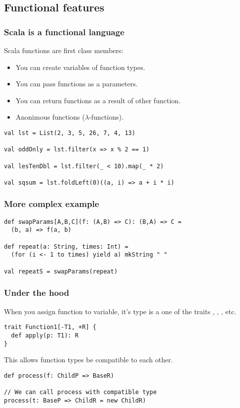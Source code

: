 \documentclass{beamer}
\begin{document}
\subsection{Functional features}

\begin{frame}[fragile]
\frametitle{Scala is a functional language}
  Scala functions are first class members:
  \begin{itemize}
    \item You can create variables of function types.
    \item You can pass functions as a parameters.
    \item You can return functions as a result of other function.
    \item Anonimous functions ($\lambda$-functions).
  \end{itemize}
  \begin{example}
\begin{lstlisting}
val lst = List(2, 3, 5, 26, 7, 4, 13)

val oddOnly = lst.filter(x => x % 2 == 1)

val lesTenDbl = lst.filter(_ < 10).map(_ * 2)

val sqsum = lst.foldLeft(0)((a, i) => a + i * i)
\end{lstlisting}
  \end{example}
\end{frame}

\begin{frame}[fragile]
\frametitle{More complex example}

    \begin{lstlisting}
def swapParams[A,B,C](f: (A,B) => C): (B,A) => C = 
  (b, a) => f(a, b)

def repeat(a: String, times: Int) = 
  (for (i <- 1 to times) yield a) mkString " "

val repeatS = swapParams(repeat)
    \end{lstlisting}

\end{frame}

\begin{frame}[fragile]
\frametitle{Under the hood}

When you assign function to variable, it's type is a one of the traits , , , etc.
\begin{lstlisting}
trait Function1[-T1, +R] {
  def apply(p: T1): R
}
\end{lstlisting}
This allows function types be compatible to each other.
\begin{example}
\begin{lstlisting}
def process(f: ChildP => BaseR)

// We can call process with compatible type
process(t: BaseP => ChildR = new ChildR)
\end{lstlisting}
\end{example}

\end{frame}
\end{document}
